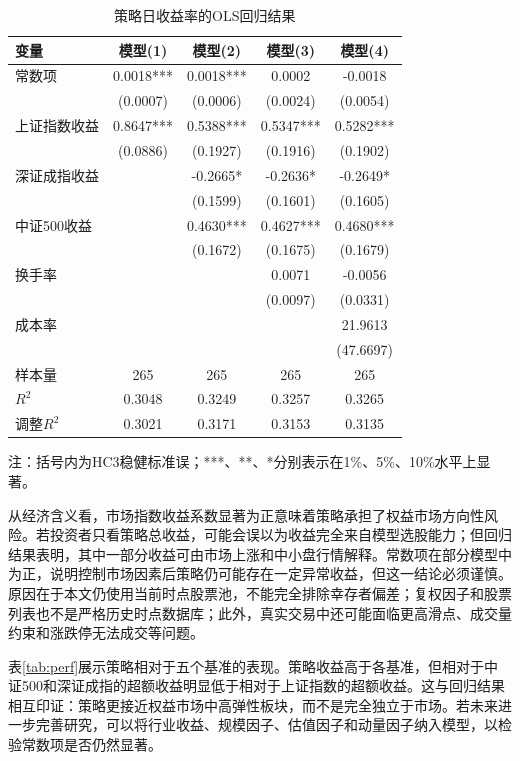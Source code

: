 \documentclass[UTF8,a4paper,12pt]{ctexart}
\begin{document}
\begin{table}[H]
\centering
\caption{策略日收益率的OLS回归结果}
\label{tab:reg}
\begin{threeparttable}
\begin{tabular}{lcccc}
\toprule
变量 & 模型(1) & 模型(2) & 模型(3) & 模型(4) \\
\midrule
常数项 & 0.0018*** & 0.0018*** & 0.0002 & -0.0018 \\
 & (0.0007) & (0.0006) & (0.0024) & (0.0054) \\
上证指数收益 & 0.8647*** & 0.5388*** & 0.5347*** & 0.5282*** \\
 & (0.0886) & (0.1927) & (0.1916) & (0.1902) \\
深证成指收益 &  & -0.2665* & -0.2636* & -0.2649* \\
 &  & (0.1599) & (0.1601) & (0.1605) \\
中证500收益 &  & 0.4630*** & 0.4627*** & 0.4680*** \\
 &  & (0.1672) & (0.1675) & (0.1679) \\
换手率 &  &  & 0.0071 & -0.0056 \\
 &  &  & (0.0097) & (0.0331) \\
成本率 &  &  &  & 21.9613 \\
 &  &  &  & (47.6697) \\
\midrule
样本量 & 265 & 265 & 265 & 265 \\
$R^2$ & 0.3048 & 0.3249 & 0.3257 & 0.3265 \\
调整$R^2$ & 0.3021 & 0.3171 & 0.3153 & 0.3135 \\
\bottomrule
\end{tabular}
\begin{tablenotes}
\small
\item 注：括号内为HC3稳健标准误；***、**、*分别表示在1\%、5\%、10\%水平上显著。
\end{tablenotes}
\end{threeparttable}
\end{table}

从经济含义看，市场指数收益系数显著为正意味着策略承担了权益市场方向性风险。若投资者只看策略总收益，可能会误以为收益完全来自模型选股能力；但回归结果表明，其中一部分收益可由市场上涨和中小盘行情解释。常数项在部分模型中为正，说明控制市场因素后策略仍可能存在一定异常收益，但这一结论必须谨慎。原因在于本文仍使用当前时点股票池，不能完全排除幸存者偏差；复权因子和股票列表也不是严格历史时点数据库；此外，真实交易中还可能面临更高滑点、成交量约束和涨跌停无法成交等问题。

表\ref{tab:perf}展示策略相对于五个基准的表现。策略收益高于各基准，但相对于中证500和深证成指的超额收益明显低于相对于上证指数的超额收益。这与回归结果相互印证：策略更接近权益市场中高弹性板块，而不是完全独立于市场。若未来进一步完善研究，可以将行业收益、规模因子、估值因子和动量因子纳入模型，以检验常数项是否仍然显著。
\end{document}

